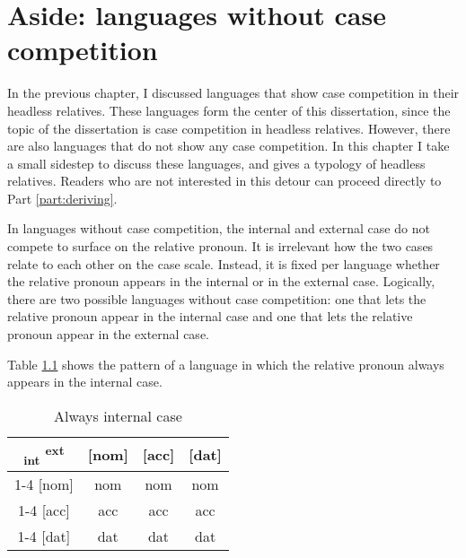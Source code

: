 
\chapter{Aside: languages without case competition}\label{sec:without-case-competition}

In the previous chapter, I discussed languages that show case competition in their headless relatives. These languages form the center of this dissertation, since the topic of the dissertation is case competition in headless relatives. However, there are also languages that do not show any case competition. In this chapter I take a small sidestep to discuss these languages, and gives a typology of headless relatives. Readers who are not interested in this detour can proceed directly to Part \ref{part:deriving}.

In languages without case competition, the internal and external case do not compete to surface on the relative pronoun. It is irrelevant how the two cases relate to each other on the case scale. Instead, it is fixed per language whether the relative pronoun appears in the internal or in the external case. Logically, there are two possible languages without case competition: one that lets the relative pronoun appear in the internal case and one that lets the relative pronoun appear in the external case.

Table \ref{tbl:no-case-competition-int} shows the pattern of a language in which the relative pronoun always appears in the internal case.

\begin{table}[ht]
  \center
  \caption{Always internal case}
  \begin{tabular}{c|c|c|c}
    \toprule
   \textsubscript{\ac{int}} \textsuperscript{\ac{ext}}
          & [\ac{nom}]
          & [\ac{acc}]
          & [\ac{dat}]
          \\ \cmidrule{1-4}
      [\ac{nom}]
          & \ac{nom}
          & \ac{nom}
          & \ac{nom}
          \\ \cmidrule{1-4}
      [\ac{acc}]
          & \ac{acc}
          & \ac{acc}
          & \ac{acc}
          \\ \cmidrule{1-4}
      [\ac{dat}]
          & \ac{dat}
          & \ac{dat}
          & \ac{dat}
          \\
    \bottomrule
  \end{tabular}
  \label{tbl:no-case-competition-int}
\end{table}


